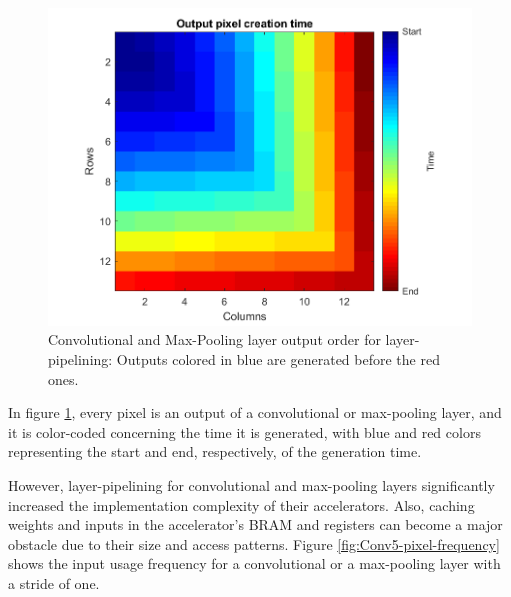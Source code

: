 \begin{figure} [H]
	\centering
	\includegraphics[width=\textwidth]{Images/Scheduling/Conv5-output-creation-time.png}
	\decoRule
	\caption[Convolutional and Max-Pooling layer output order for layer-pipelining]{Convolutional and Max-Pooling layer output order for layer-pipelining: Outputs colored in blue are generated before the red ones.}
	\label{fig:output-generation-order}
\end{figure}

In figure \ref{fig:output-generation-order}, every pixel is an output of a convolutional or max-pooling layer, and it is color-coded concerning the time it is generated, with blue and red colors representing the start and end, respectively, of the generation time.

However, layer-pipelining for convolutional and max-pooling layers significantly increased the implementation complexity of their accelerators. Also, caching weights and inputs in the accelerator's BRAM and registers can become a major obstacle due to their size and access patterns. Figure \ref{fig:Conv5-pixel-frequency} shows the input usage frequency for a convolutional or a max-pooling layer with a stride of one.

